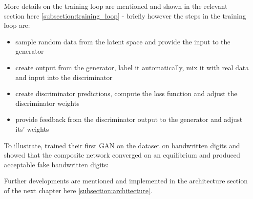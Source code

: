 More details on the training loop are mentioned and shown in the relevant section here \ref{subsection:training_loop} - briefly however the steps in the training loop are:

\begin{itemize}
	\item sample random data from the latent space and provide the input to the generator
	\item create output from the generator, label it automatically, mix it with real data and input into the discriminator
	\item create discriminator predictions, compute the loss function and adjust the discriminator weights
	\item provide feedback from the discriminator output to the generator and adjust its' weights
\end{itemize}

\clearpage

To illustrate, \cite{goodfellow2014generative} trained their first \ac{GAN} on the \cite{mnist} dataset on handwritten digits and showed that the composite network converged on an equilibrium and produced acceptable fake handwritten digits:


Further developments are mentioned and implemented in the architecture section of the next chapter here \ref{subsection:architecture}.
